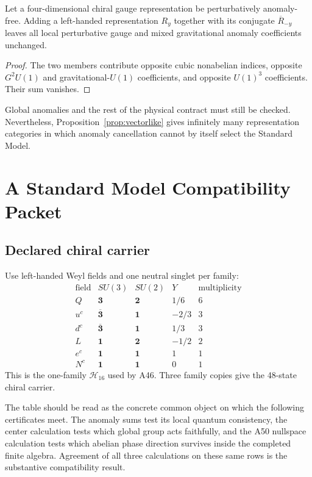 \documentclass[11pt]{article}
\newcommand{\Hilbert}{\mathcal H}
\begin{document}
\begin{proposition}
\label{prop:vectorlike}
Let a four-dimensional chiral gauge representation be perturbatively
anomaly-free.  Adding a left-handed representation $R_y$ together with its
conjugate $\overline R_{-y}$ leaves all local perturbative gauge and mixed
gravitational anomaly coefficients unchanged.
\end{proposition}

\begin{proof}
The two members contribute opposite cubic nonabelian indices, opposite
$G^2U(1)$ and gravitational-$U(1)$ coefficients, and opposite $U(1)^3$
coefficients.  Their sum vanishes.
\end{proof}

Global anomalies and the rest of the physical contract must still be checked.
Nevertheless, Proposition~\ref{prop:vectorlike} gives infinitely many
representation categories in which anomaly cancellation cannot by itself
select the Standard Model.

\section{A Standard Model Compatibility Packet}

\subsection{Declared chiral carrier}

Use left-handed Weyl fields and one neutral singlet per family:
\[
\begin{array}{c|c|c|c|c}
\text{field} & SU(3) & SU(2) & Y & \text{multiplicity}\\
\hline
Q     & \mathbf 3             & \mathbf 2 & 1/6  & 6\\
u^c   & \overline{\mathbf 3}  & \mathbf 1 & -2/3 & 3\\
d^c   & \overline{\mathbf 3}  & \mathbf 1 & 1/3  & 3\\
L     & \mathbf 1             & \mathbf 2 & -1/2 & 2\\
e^c   & \mathbf 1             & \mathbf 1 & 1    & 1\\
N^c   & \mathbf 1             & \mathbf 1 & 0    & 1
\end{array}
\]
This is the one-family $\Hilbert_{16}$ used by A46.  Three family copies give
the 48-state chiral carrier.

The table should be read as the concrete common object on which the following
certificates meet.  The anomaly sums test its local quantum consistency, the
center calculation tests which global group acts faithfully, and the A50
nullspace calculation tests which abelian phase direction survives inside the
completed finite algebra.  Agreement of all three calculations on these same
rows is the substantive compatibility result.
\end{document}
